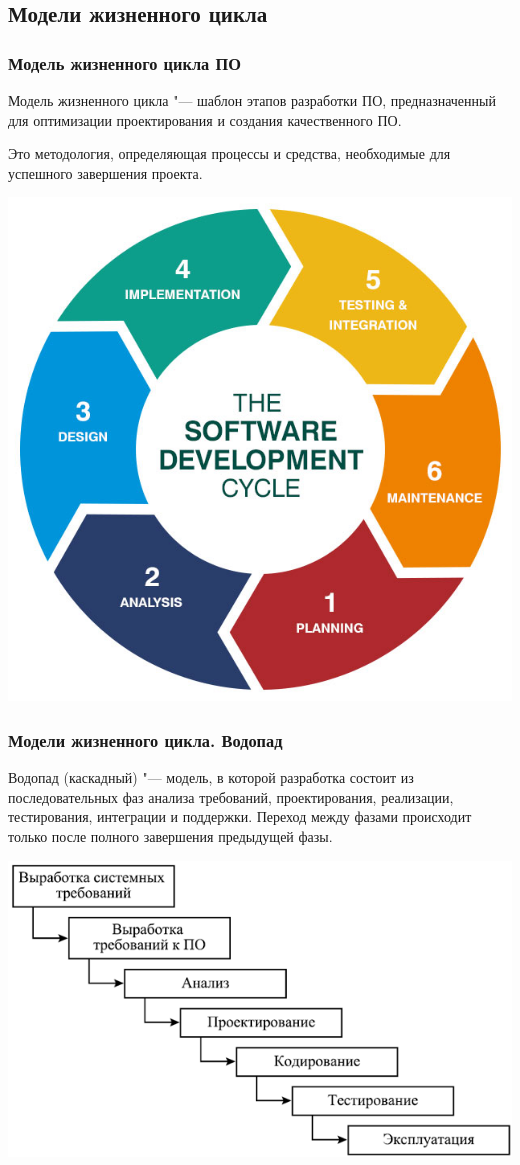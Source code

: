 \documentclass{../industrial-development}
\begin{document}
\subsection{Модели жизненного цикла}


\begin{frame} \frametitle{Модель жизненного цикла ПО}
	Модель жизненного цикла "--- шаблон этапов разработки ПО, предназначенный для оптимизации проектирования и создания качественного ПО.
	
	Это методология, определяющая процессы и средства, необходимые для успешного завершения проекта.
	
	\centerline{\includegraphics[height=0.50\textheight]{image14.png}}
\end{frame}
\lecturenotes


\begin{frame} \frametitle{Модели жизненного цикла. Водопад}
	Водопад (каскадный) "--- модель, в которой разработка состоит из последовательных фаз анализа требований, проектирования, реализации, тестирования, интеграции и поддержки. Переход между фазами происходит только после полного завершения предыдущей фазы.
	
	\centerline{\includegraphics[height=0.50\textheight]{image16.png}}
\end{frame}
\lecturenotes
\end{document}
